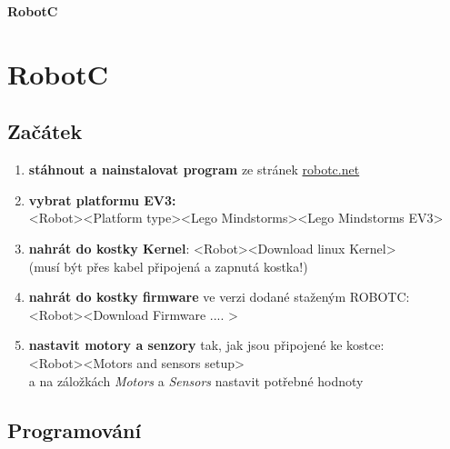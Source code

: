 \documentclass[12pt]{article}
\begin{document}
	\begin{center}
		\Huge \textbf{RobotC} 
	\end{center}

\section{RobotC}

\subsection{Začátek}
\begin{enumerate}
	\item \textbf{stáhnout a nainstalovat program} ze stránek \href{http://www.robotc.net/download/lego/}{robotc.net}
	\item \textbf{vybrat platformu EV3:} \\
	 \textless Robot\textgreater \textless Platform type\textgreater \textless Lego Mindstorms\textgreater \textless Lego Mindstorms EV3\textgreater 
	\item \textbf{nahrát do kostky Kernel}: \textless Robot\textgreater \textless Download linux Kernel\textgreater  \\
	(musí být přes kabel připojená a zapnutá kostka!)
	\item  \textbf{nahrát do kostky firmware} ve verzi dodané staženým ROBOTC: \\
	\textless Robot\textgreater \textless Download Firmware .... \textgreater 
	
	\item \textbf{nastavit motory a senzory} tak, jak jsou připojené ke kostce:\\
	\textless Robot\textgreater \textless Motors and sensors setup\textgreater  \\ a na záložkách \textit{Motors} a \textit{Sensors} nastavit potřebné hodnoty
	
\end{enumerate}
  
\subsection{Programování}
  
\end{document}
